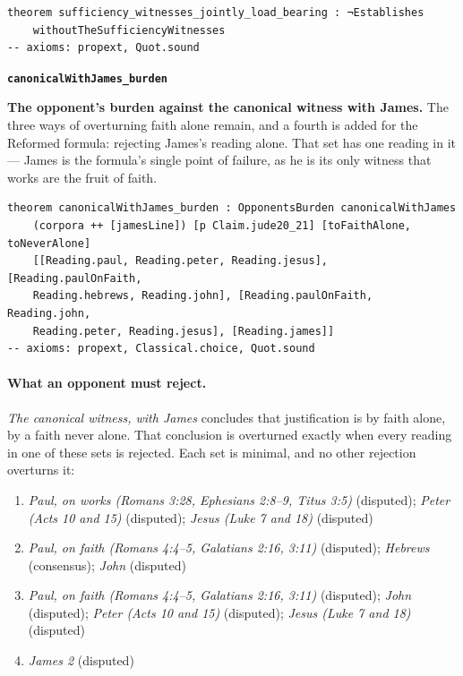\documentclass[11pt]{article}
\begin{document}
{\small\begin{verbatim}
theorem sufficiency_witnesses_jointly_load_bearing : ¬Establishes
    withoutTheSufficiencyWitnesses
-- axioms: propext, Quot.sound
\end{verbatim}}
\par\medskip\noindent\textbf{\texttt{canonical\allowbreak{}With\allowbreak{}James\_\allowbreak{}burden}}\par\nobreak\noindent
\textbf{The opponent's burden against the canonical witness with James.} The three ways of overturning faith alone remain, and a fourth is added for the Reformed formula: rejecting James's reading alone. That set has one reading in it — James is the formula's single point of failure, as he is its only witness that works are the fruit of faith.

{\small\begin{verbatim}
theorem canonicalWithJames_burden : OpponentsBurden canonicalWithJames
    (corpora ++ [jamesLine]) [p Claim.jude20_21] [toFaithAlone, toNeverAlone]
    [[Reading.paul, Reading.peter, Reading.jesus], [Reading.paulOnFaith,
    Reading.hebrews, Reading.john], [Reading.paulOnFaith, Reading.john,
    Reading.peter, Reading.jesus], [Reading.james]]
-- axioms: propext, Classical.choice, Quot.sound
\end{verbatim}}
\paragraph{What an opponent must reject.} \emph{The canonical witness, with James} concludes that justification is by faith alone, by a faith never alone. That conclusion is overturned exactly when every reading in one of these sets is rejected. Each set is minimal, and no other rejection overturns it:
\begin{enumerate}
\item \emph{Paul, on works (Romans 3:28, Ephesians 2:8–9, Titus 3:5)} (disputed); \emph{Peter (Acts 10 and 15)} (disputed); \emph{Jesus (Luke 7 and 18)} (disputed)
\item \emph{Paul, on faith (Romans 4:4–5, Galatians 2:16, 3:11)} (disputed); \emph{Hebrews} (consensus); \emph{John} (disputed)
\item \emph{Paul, on faith (Romans 4:4–5, Galatians 2:16, 3:11)} (disputed); \emph{John} (disputed); \emph{Peter (Acts 10 and 15)} (disputed); \emph{Jesus (Luke 7 and 18)} (disputed)
\item \emph{James 2} (disputed)
\end{enumerate}
\end{document}
